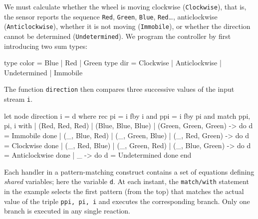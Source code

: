 \documentclass[11pt,titlepage,twoside]{report}
\makeatletter
\newcommand{\zls}[1]{{\@span{class="zelusinline"}#1}}
\newcommand{\zls}[1]{\texttt{#1}}
\renewcommand{\zls}[1]{\texttt{#1}}
\makeatother
\begin{document}
We must calculate whether the wheel is moving clockwise (\zls{Clockwise}), 
that is, the sensor reports the sequence \zls{Red}, \zls{Green}, \zls{Blue}, 
\zls{Red}\ldots, anticlockwise (\zls{Anticlockwise}), whether it is not 
moving (\zls{Immobile}), or whether the direction cannot be determined 
(\zls{Undetermined}).
We program the controller by first introducing two sum types:
\begin{chklisting}
type color = Blue | Red | Green
type dir = Clockwise | Anticlockwise | Undetermined | Immobile
\end{chklisting}
The function \zls{direction} then compares three successive values of the 
input stream \zls{i}.
\begin{chklisting}
let node direction i = d where
  rec pi = i fby i
  and ppi = i fby pi
  and match ppi, pi, i with
      | (Red, Red, Red) | (Blue, Blue, Blue) | (Green, Green, Green) ->
             do d = Immobile done
      | (_, Blue, Red) | (_, Green, Blue) | (_, Red, Green) ->
             do d = Clockwise done
      | (_, Red, Blue) | (_, Green, Red) | (_, Blue, Green) ->
             do d = Anticlockwise done
      | _ -> do d = Undetermined done
  end
\end{chklisting}

Each handler in a pattern-matching construct contains a set of
equations defining \emph{shared} variables; here the variable
\zls{d}.
At each instant, the \zls{match/with} statement in the example selects
the first pattern (from the top) that matches the actual value
of the triple \zls{ppi, pi, i} and executes the corresponding
branch.
Only one branch is executed in any single reaction.
\end{document}
